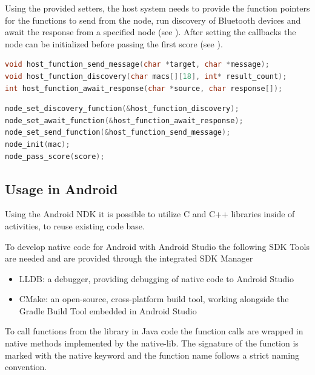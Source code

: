 Using the provided setters, the host system needs to provide the function pointers for the functions to send from the node, run discovery of Bluetooth devices and await the response from a specified node (see ). After setting the callbacks the node can be initialized before passing the first score (see ).

\begin{lstlisting}[language=C, caption={Prototypes for host callbacks}, label={Prototypes for host callbacks}, float, floatplacement=H]
void host_function_send_message(char *target, char *message);
void host_function_discovery(char macs[][18], int* result_count);
int host_function_await_response(char *source, char response[]);
\end{lstlisting}

\begin{lstlisting}[language=C, caption={Node setup and system start}, label={Node setup and system start}, float, floatplacement=H]
node_set_discovery_function(&host_function_discovery);
node_set_await_function(&host_function_await_response);
node_set_send_function(&host_function_send_message);
node_init(mac);
node_pass_score(score);
\end{lstlisting}


\subsection{Usage in Android} \label{Usage in Android}
Using the Android \gls{NDK} it is possible to utilize C and C++ libraries inside of activities, to reuse existing code base.

To develop native code for Android with Android Studio the following \gls{SDK} Tools are needed and are provided through the integrated \gls{SDK} Manager

\begin{itemize}
	\item LLDB: a debugger, providing debugging of native code to Android Studio
	\item CMake: an open-source, cross-platform build tool, working alongside the Gradle Build Tool embedded in Android Studio 
\end{itemize} 

To call functions from the library in Java code the function calls are wrapped in native methods implemented by the native-lib. The signature of the function is marked with the native keyword and the function name follows a strict naming convention.

